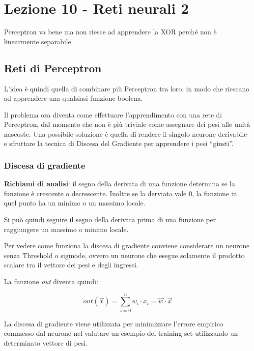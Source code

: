 \section{Lezione 10 - Reti neurali 2}\label{lezione-10---reti-neurali-2}

Perceptron va bene ma non riesce ad apprendere la XOR perché non è
linearmente separabile.

\subsection{Reti di Perceptron}\label{reti-di-perceptron}

L'idea è quindi quella di combinare più Perceptron tra loro, in modo che
riescano ad apprendere una qualsiasi funzione boolena.

Il problema ora diventa come effettuare l'apprendimento con una rete di
Perceptron, dal momento che non è più triviale come assegnare dei pesi
alle unità nascoste. Una possibile soluzione è quella di rendere il
singolo neurone derivabile e sfruttare la tecnica di Discesa del
Gradiente per apprendere i pesi ``giusti''.

\subsubsection{Discesa di gradiente}\label{discesa-di-gradiente}

\textbf{Richiami di analisi}: il segno della derivata di una funzione
determina se la funzione è crescente o decrescente. Inoltre se la
derviata vale 0, la funzione in quel punto ha un minimo o un massimo
locale.

Si può quindi seguire il segno della derivata prima di una funzione per
raggiungere un massimo o minimo locale.

Per vedere come funziona la discesa di gradiente conviene considerare un neurone senza Threshold o sigmode, ovvero un neurone che esegue solamente il prodotto scalare tra il vettore dei pesi e degli ingressi.

La funzione \textit{out} diventa quindi:

$$
out(\vec{x}) = \sum\limits_{i=0}^n w_i \cdot x_i = \vec{w} \cdot \vec{x}
$$

La discesa di gradiente viene utilizzata per minimizzare l'errore empirico commesso dal neurone nel valutare un esempio del training set utilizzando un determinato vettore di pesi.

